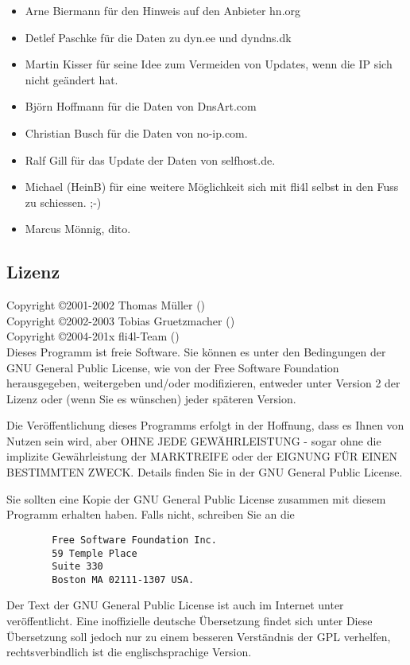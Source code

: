 \begin{itemize}
\item Arne Biermann für den Hinweis auf den Anbieter hn.org
\item Detlef Paschke für die Daten zu dyn.ee und dyndns.dk
\item Martin Kisser für seine Idee zum Vermeiden von Updates, wenn die
	IP sich nicht geändert hat.
\item Björn Hoffmann für die Daten von DnsArt.com
\item Christian Busch für die Daten von no-ip.com.
\item Ralf Gill für das Update der Daten von selfhost.de.
\item Michael (HeinB) für eine weitere Möglichkeit sich mit fli4l selbst
	in den Fuss zu schiessen. ;-)
\item Marcus Mönnig, dito.
\end{itemize}

\subsection{Lizenz}

Copyright \copyright  2001-2002 Thomas Müller () \\
Copyright \copyright  2002-2003 Tobias Gruetzmacher () \\
Copyright \copyright  2004-201x fli4l-Team () \\

Dieses Programm ist freie Software. Sie können es unter
den Bedingungen der GNU General Public License, wie von der
Free Software Foundation herausgegeben, weitergeben und/oder
modifizieren, entweder unter Version 2 der Lizenz oder (wenn
Sie es wünschen) jeder späteren Version.

Die Veröffentlichung dieses Programms erfolgt in der
Hoffnung, dass es Ihnen von Nutzen sein wird, aber OHNE JEDE
GEWÄHRLEISTUNG - sogar ohne die implizite Gewährleistung
der MARKTREIFE oder der EIGNUNG FÜR EINEN BESTIMMTEN ZWECK.
Details finden Sie in der GNU General Public License.

Sie sollten eine Kopie der GNU General Public License zusammen
mit diesem Programm erhalten haben. Falls nicht, schreiben Sie
an die

\begin{verbatim}
		Free Software Foundation Inc.
		59 Temple Place
		Suite 330
		Boston MA 02111-1307 USA.
\end{verbatim}

Der Text der GNU General Public License ist auch im Internet unter
 veröffentlicht. Eine
inoffizielle deutsche Übersetzung findet sich unter
Diese Übersetzung soll jedoch nur zu einem besseren Verständnis
der GPL verhelfen, rechtsverbindlich ist die englischsprachige Version.

